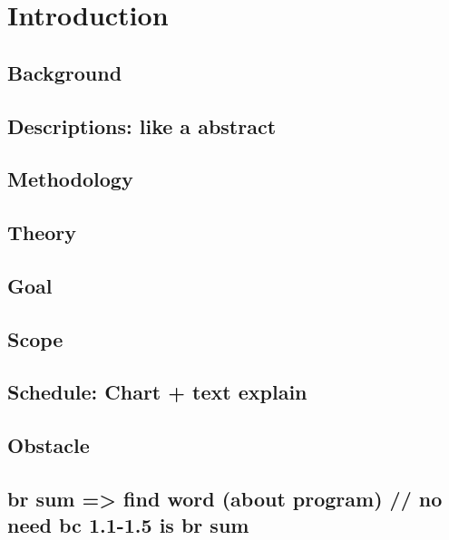 \documentclass[11pt]{article}
\begin{document}
\newpage

\section{Introduction}
	\subsection{Background}
	\subsection{Descriptions: like a abstract}
	\subsection{Methodology} 
	\subsection{Theory}
	\subsection{Goal}
	\subsection{Scope}
	\subsection{Schedule: Chart + text explain}
	\subsection{Obstacle}
	\subsection{br sum => find word (about program) // no need bc 1.1-1.5 is br sum}
	
\newpage
\end{document}
